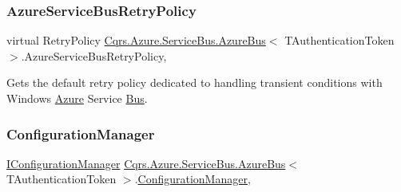 \mbox{\label{classCqrs_1_1Azure_1_1ServiceBus_1_1AzureBus_a88997183f8e6fa9dcef5b883329e95ce_a88997183f8e6fa9dcef5b883329e95ce}} 
\subsubsection{\texorpdfstring{Azure\+Service\+Bus\+Retry\+Policy}{AzureServiceBusRetryPolicy}}
{\footnotesize\ttfamily virtual Retry\+Policy \hyperlink{classCqrs_1_1Azure_1_1ServiceBus_1_1AzureBus}{Cqrs.\+Azure.\+Service\+Bus.\+Azure\+Bus}$<$ T\+Authentication\+Token $>$.Azure\+Service\+Bus\+Retry\+Policy\hspace{0.3cm}{\ttfamily [get]}, {\ttfamily [protected]}}



Gets the default retry policy dedicated to handling transient conditions with Windows \hyperlink{namespaceCqrs_1_1Azure}{Azure} Service \hyperlink{namespaceCqrs_1_1Bus}{Bus}. 

\mbox{\label{classCqrs_1_1Azure_1_1ServiceBus_1_1AzureBus_aaf9469d220fb23cb0521fa76b25ab228_aaf9469d220fb23cb0521fa76b25ab228}} 
\subsubsection{\texorpdfstring{Configuration\+Manager}{ConfigurationManager}}
{\footnotesize\ttfamily \hyperlink{interfaceCqrs_1_1Configuration_1_1IConfigurationManager}{I\+Configuration\+Manager} \hyperlink{classCqrs_1_1Azure_1_1ServiceBus_1_1AzureBus}{Cqrs.\+Azure.\+Service\+Bus.\+Azure\+Bus}$<$ T\+Authentication\+Token $>$.\hyperlink{classCqrs_1_1Configuration_1_1ConfigurationManager}{Configuration\+Manager}\hspace{0.3cm}{\ttfamily [get]}, {\ttfamily [protected]}}

